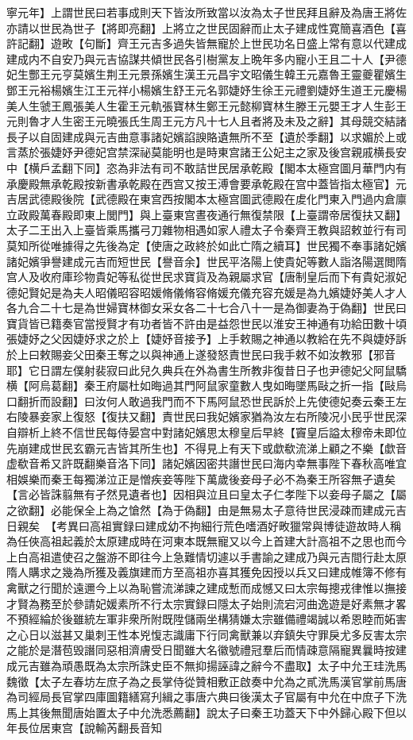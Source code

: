 寧元年】上謂世民曰若事成則天下皆汝所致當以汝為太子世民拜且辭及為唐王將佐亦請以世民為世子【將即亮翻】上將立之世民固辭而止太子建成性寛簡喜酒色【喜許記翻】遊畋【句斷】齊王元吉多過失皆無寵於上世民功名日盛上常有意以代建成建成内不自安乃與元吉協謀共傾世民各引樹黨友上晩年多内寵小王且二十人【尹德妃生酆王元亨莫嬪生荆王元景孫嬪生漢王元昌宇文昭儀生韓王元嘉魯王靈夔瞿嬪生鄧王元裕楊嬪生江王元祥小楊嬪生舒王元名郭婕妤生徐王元禮劉婕妤生道王元慶楊美人生虢王鳳張美人生霍王元軌張寶林生鄭王元懿柳寶林生滕王元嬰王才人生彭王元則魯才人生密王元曉張氏生周王元方凡十七人且者將及未及之辭】其母競交結諸長子以自固建成與元吉曲意事諸妃嬪諂諛賂遺無所不至【遺於季翻】以求媚於上或言蒸於張婕妤尹德妃宫禁深祕莫能明也是時東宫諸王公妃主之家及後宫親戚横長安中【横戶孟翻下同】恣為非法有司不敢詰世民居承乾殿【閣本太極宫圖月華門内有承慶殿無承乾殿按新書承乾殿在西宫又按王溥會要承乾殿在宫中蓋皆指太極官】元吉居武德殿後院【武德殿在東宫西按閣本太極宫圖武德殿在䖍化門東入門過内倉廪立政殿萬春殿即東上閭門】與上臺東宫晝夜通行無復禁限【上臺謂帝居復扶又翻】太子二王出入上臺皆乘馬攜弓刀雜物相遇如家人禮太子令秦齊王教與詔敕並行有司莫知所從唯據得之先後為定【使唐之政終於如此亡隋之續耳】世民獨不奉事諸妃嬪諸妃嬪爭譽建成元吉而短世民【譽音余】世民平洛陽上使貴妃等數人詣洛陽選閲隋宫人及收府庫珍物貴妃等私從世民求寶貨及為親屬求官【唐制皇后而下有貴妃淑妃德妃賢妃是為夫人昭儀昭容昭媛脩儀脩容脩媛充儀充容充媛是為九嬪婕妤美人才人各九合二十七是為世婦寶林御女采女各二十七合八十一是為御妻為于偽翻】世民曰寶貨皆已籍奏官當授賢才有功者皆不許由是益怨世民以淮安王神通有功給田數十頃張婕妤之父因婕妤求之於上【婕妤音接予】上手敕賜之神通以教給在先不與婕妤訴於上曰敕賜妾父田秦王奪之以與神通上遂發怒責世民曰我手敕不如汝教邪【邪音耶】它日謂左僕射裴寂曰此兒久典兵在外為書生所教非復昔日子也尹德妃父阿鼠驕横【阿烏葛翻】秦王府屬杜如晦過其門阿鼠家童數人曳如晦墜馬敺之折一指【敺烏口翻折而設翻】曰汝何人敢過我門而不下馬阿鼠恐世民訴於上先使德妃奏云秦王左右陵暴妾家上復怒【復扶又翻】責世民曰我妃嬪家猶為汝左右所陵况小民乎世民深自辯析上終不信世民每侍晏宫中對諸妃嬪思太穆皇后早終【竇皇后謚太穆帝未即位先崩建成世民玄霸元吉皆其所生也】不得見上有天下或歔欷流涕上顧之不樂【歔音虚欷音希又許既翻樂音洛下同】諸妃嬪因密共譖世民曰海内幸無事陛下春秋高唯宜相娛樂而秦王每獨涕泣正是憎疾妾等陛下萬歲後妾母子必不為秦王所容無孑遺矣【言必皆誅翦無有孑然見遺者也】因相與泣且曰皇太子仁孝陛下以妾母子屬之【屬之欲翻】必能保全上為之愴然【為于偽翻】由是無易太子意待世民浸疎而建成元吉日親矣　【考異曰高祖實録曰建成幼不拘細行荒色嗜酒好畋獵常與博徒遊故時人稱為任俠高祖起義於太原建成時在河東本既無寵又以今上首建大計高祖不之思也而今上白高祖遣使召之盤游不即往今上急難情切遽以手書諭之建成乃與元吉間行赴太原隋人購求之幾為所獲及義旗建而方至高祖亦喜其獲免因授以兵又曰建成帷簿不修有禽獸之行聞於遠邇今上以為恥嘗流涕諫之建成慙而成憾又曰太宗每摠戎律惟以撫接才賢為務至於參請妃媛素所不行太宗實録曰隱太子始則流宕河曲逸遊是好素無才畧不預經綸於後雖統左軍非衆所附既陞儲兩坐構猜嫌太宗雖備禮竭誠以希恩睦而妬害之心日以滋甚又巢刺王性本兇愎志識庸下行同禽獸兼以弃鎮失守罪戾尤多反害太宗之能於是潛苞毁譖同惡相濟膚受日聞雖大名徽號禮冠羣后而情疎意隔寵異曩時按建成元吉雖為頑愚既為太宗所誅史臣不無抑揚誣諱之辭今不盡取】太子中允王珪洗馬魏徵【太子左春坊左庶子為之長掌侍從贊相敷正啟奏中允為之貳洗馬漢官掌前馬唐為司經局長官掌四庫圖籍繕寫刋緝之事唐六典曰後漢太子官屬有中允在中庶子下洗馬上其後無聞唐始置太子中允洗悉薦翻】說太子曰秦王功蓋天下中外歸心殿下但以年長位居東宫【說輸芮翻長音知